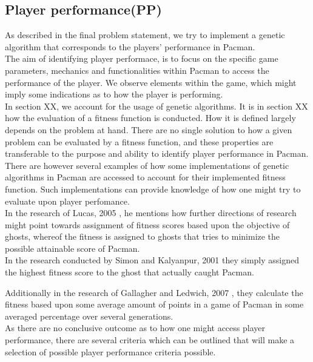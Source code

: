 \subsection{Player performance(PP)}

As described in the final problem statement, we try to implement a genetic algorithm that corresponds to the players' performance in Pacman.\\


The aim of identifying player performace, is to focus on the specific game parameters, mechanics and functionalities within Pacman to access the performance of the player. We observe elements within the game, which might imply some indications as to how the player is performing.\\

In section XX, we account for the usage of genetic algorithms. It is in section XX how the evaluation of a fitness function is conducted. How it is defined largely depends on the problem at hand. There are no single solution to how a given problem can be evaluated by a fitness function, and these properties are transferable to the purpose and ability to identify player performance in Pacman.\\

There are however several examples of how some implementations of genetic algorithms in Pacman are accessed to account for their implemented fitness function. Such implementations can provide knowledge of how one might try to evaluate upon player perfomance.\\

In the research of Lucas, 2005 \cite{Lucas2005}, he mentions how further directions of research might point towards assignment of fitness scores based upon the objective of ghosts, whereof the fitness is assigned to ghosts that tries to minimize the possible attainable score of Pacman.\\

In the research conducted by Simon and Kalyanpur, 2001 \cite{Kalyanpur2001} they simply assigned the highest fitness score to the ghost that actually caught Pacman.

Additionally in the research of Gallagher and Ledwich, 2007 \cite{Gallagher2007}, they calculate the fitness based upon some average amount of points in a game of Pacman in some averaged percentage over several generations.\\

As there are no conclusive outcome as to how one might access player performance, there are several criteria which can be outlined that will make a selection of possible player performance criteria possible.

